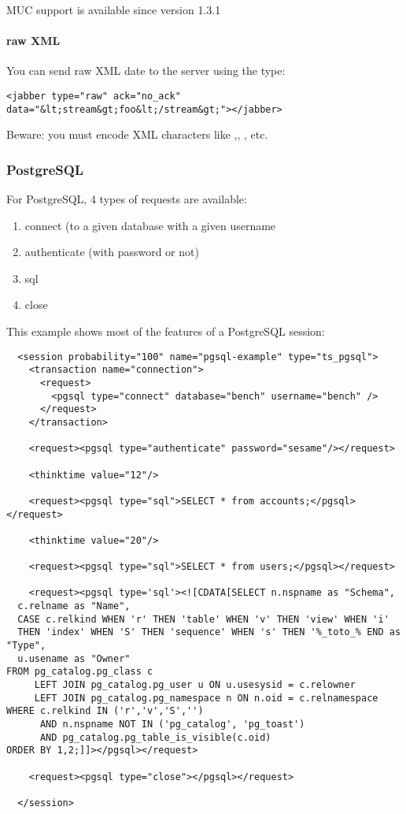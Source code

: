 \documentclass{TSUNG-en}
\begin{document}
MUC support is available since version 1.3.1

\paragraph{raw XML}
You can send raw XML date to the server using the  type:
\begin{Verbatim}
<jabber type="raw" ack="no_ack" data="&lt;stream&gt;foo&lt;/stream&gt;"></jabber>
\end{Verbatim}

Beware: you must encode XML characters like \userinput{<}
,\userinput{>}, \userinput{\&}, etc.

\subsubsection{PostgreSQL}

For PostgreSQL, 4 types of requests are available:
\begin{enumerate}
\item connect (to a given database with a given username
\item authenticate (with password or not)
\item sql
\item close
\end{enumerate}

This example shows most of the features of a PostgreSQL session:

\begin{Verbatim}
  <session probability="100" name="pgsql-example" type="ts_pgsql">
    <transaction name="connection">
      <request>
        <pgsql type="connect" database="bench" username="bench" />
      </request>
    </transaction>

    <request><pgsql type="authenticate" password="sesame"/></request>

    <thinktime value="12"/>

    <request><pgsql type="sql">SELECT * from accounts;</pgsql></request>

    <thinktime value="20"/>

    <request><pgsql type="sql">SELECT * from users;</pgsql></request>

    <request><pgsql type='sql'><![CDATA[SELECT n.nspname as "Schema",
  c.relname as "Name",
  CASE c.relkind WHEN 'r' THEN 'table' WHEN 'v' THEN 'view' WHEN 'i'
  THEN 'index' WHEN 'S' THEN 'sequence' WHEN 's' THEN '%_toto_% END as "Type",
  u.usename as "Owner"
FROM pg_catalog.pg_class c
     LEFT JOIN pg_catalog.pg_user u ON u.usesysid = c.relowner
     LEFT JOIN pg_catalog.pg_namespace n ON n.oid = c.relnamespace
WHERE c.relkind IN ('r','v','S','')
      AND n.nspname NOT IN ('pg_catalog', 'pg_toast')
      AND pg_catalog.pg_table_is_visible(c.oid)
ORDER BY 1,2;]]></pgsql></request>

    <request><pgsql type="close"></pgsql></request>

  </session>
\end{Verbatim}
\end{document}
